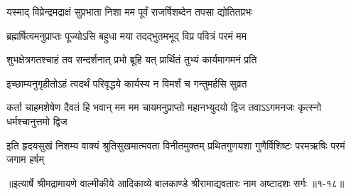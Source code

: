 \twolineshloka
{यस्माद् विप्रेन्द्रमद्राक्षं सुप्रभाता निशा मम}
{पूर्वं राजर्षिशब्देन तपसा द्योतितप्रभः} %

\twolineshloka
{ब्रह्मर्षित्वमनुप्राप्तः पूज्योऽसि बहुधा मया}
{तदद्भुतमभूद् विप्र पवित्रं परमं मम} %

\twolineshloka
{शुभक्षेत्रगतश्चाहं तव सन्दर्शनात् प्रभो}
{ब्रूहि यत् प्रार्थितं तुभ्यं कार्यमागमनं प्रति} %

\twolineshloka
{इच्छाम्यनुगृहीतोऽहं त्वदर्थं परिवृद्धये}
{कार्यस्य न विमर्शं च गन्तुमर्हसि सुव्रत} %

\threelineshloka
{कर्ता चाहमशेषेण दैवतं हि भवान् मम}
{मम चायमनुप्राप्तो महानभ्युदयो द्विज}
{तवाऽऽगमनजः कृत्स्नो धर्मश्चानुत्तमो द्विज} %

\fourlineindentedshloka
{इति हृदयसुखं निशम्य वाक्यं}
{श्रुतिसुखमात्मवता विनीतमुक्तम्}
{प्रथितगुणयशा गुणैर्विशिष्टः}
{परमऋषिः परमं जगाम हर्षम्} %


॥इत्यार्षे श्रीमद्रामायणे वाल्मीकीये आदिकाव्ये बालकाण्डे श्रीरामाद्यवतारः नाम अष्टादशः सर्गः ॥१-१८॥
